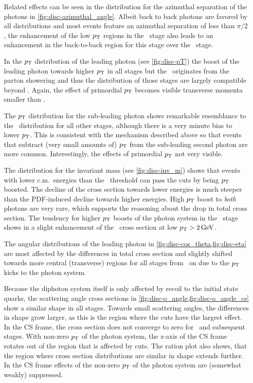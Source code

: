 Related effects can be seen in the distribution for the azimuthal
separation of the photons in \cref{fig:disc-azimuthal_angle}. Albeit
back to back photons are favored by all distributions and most events
feature an azimuthal separation of less than \(\pi/2\), the
enhancement of the low \(p_\mathrm{T}\) regions in the \stthree\ stage also
leads to an enhancement in the back-to-back region for this stage over
the \sttwo\ stage.

In the \(p_\mathrm{T}\) distribution of the leading photon (see
\cref{fig:disc-pT}) the boost of the leading photon towards higher
\(p_\mathrm{T}\) in all stages but the \stone\ originates from the parton
showering and thus the distribution of those stages are largely
compatible beyond . Again, the effect of primordial \(p_\mathrm{T}\)
becomes visible transverse momenta smaller than .

The \(p_\mathrm{T}\) distribution for the sub-leading photon shows remarkable
resemblance to the \stone\ distribution for all other stages, although
there is a very minute bias to lower \(p_\mathrm{T}\). This is consistent with
the mechanism described above so that events that subtract (very small
amounts of) \(p_\mathrm{T}\) from the sub-leading second photon are more
common. Interestingly, the effects of primordial \(p_\mathrm{T}\) not very
visible.

The distribution for the invariant mass (see \cref{fig:disc-inv_m})
shows that events with lower c.m.\ energies than the \stone\ threshold
can pass the cuts by being \(p_\mathrm{T}\) boosted. The decline of the cross
section towards lower energies is much steeper than the PDF-induced
decline towards higher energies. High \(p_\mathrm{T}\) boost to \emph{both}
photons are very rare, which supports the reasoning about the drop in
total cross section. The tendency for higher \(p_\mathrm{T}\) boosts of the
photon system in the \sttwo\ stage shows in a slight enhancement of
the \sttwo\ cross section at low \(p_\mathrm{T} > \SI{2}{\giga\electronvolt}\).

The angular distributions of the leading photon in
\cref{fig:disc-cos_theta,fig:disc-eta} are most affected by the
differences in total cross section and slightly shifted towards more
central (transverse) regions for all stages from \sttwo\ on due to the
\(p_\mathrm{T}\) kicks to the photon system.

Because the diphoton system itself is only affected by recoil to the
initial state quarks, the scattering angle cross sections in
\cref{fig:disc-o_angle,fig:disc-o_angle_cs} show a similar shape in
all stages. Towards small scattering angles, the differences in shape
grow larger, as this is the region where the cuts have the largest
effect. In the CS frame, the cross section does not converge to zero
for \sttwo\ and subsequent stages. With non-zero \(p_\mathrm{T}\) of the photon
system, the z-axis of the CS frame rotates out of the region that is
affected by cuts. The ration plot also shows, that the region where
cross section distributions are similar in shape extends further. In
the CS frame effects of the non-zero \(p_\mathrm{T}\) of the photon system are
(somewhat weakly) suppressed.

